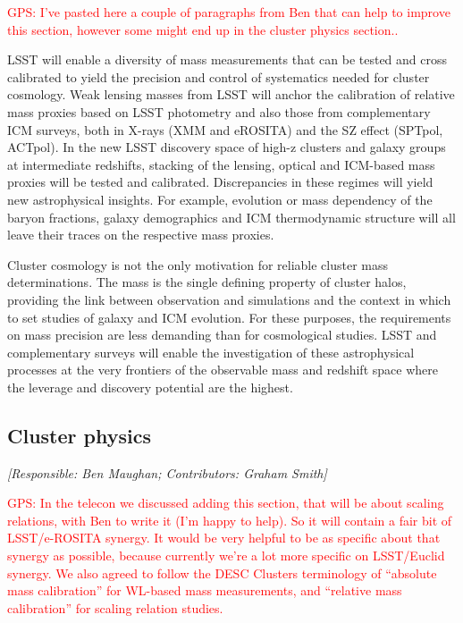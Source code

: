 \documentclass[a4paper,11pt]{article}
\newcommand{\red}{\textcolor{red}}
\begin{document}
\red{GPS: I've pasted here a couple of paragraphs from Ben that can
  help to improve this section, however some might end up in the
  cluster physics section..}

LSST will enable a diversity of mass measurements that can be tested
and cross calibrated to yield the precision and control of systematics
needed for cluster cosmology. Weak lensing masses from LSST will
anchor the calibration of relative mass proxies based on LSST
photometry and also those from complementary ICM surveys, both in
X-rays (XMM and eROSITA) and the SZ effect (SPTpol, ACTpol). In the
new LSST discovery space of high-z clusters and galaxy groups at
intermediate redshifts, stacking of the lensing, optical and ICM-based
mass proxies will be tested and calibrated. Discrepancies in these
regimes will yield new astrophysical insights. For example, evolution
or mass dependency of the baryon fractions, galaxy demographics and
ICM thermodynamic structure will all leave their traces on the
respective mass proxies.

Cluster cosmology is not the only motivation for reliable cluster mass
determinations. The mass is the single defining property of cluster
halos, providing the link between observation and simulations and the
context in which to set studies of galaxy and ICM evolution. For these
purposes, the requirements on mass precision are less demanding than
for cosmological studies. LSST and complementary surveys will enable
the investigation of these astrophysical processes at the very
frontiers of the observable mass and redshift space where the leverage
and discovery potential are the highest.

\subsection{Cluster physics}\label{sec:physics}

{\it [Responsible: Ben Maughan; Contributors: Graham Smith]}

\noindent\red{GPS: In the telecon we discussed adding this section,
  that will be about scaling relations, with Ben to write it (I'm
  happy to help).  So it will contain a fair bit of LSST/e-ROSITA
  synergy.  It would be very helpful to be as specific about that
  synergy as possible, because currently we're a lot more specific on
  LSST/Euclid synergy.  We also agreed to follow the DESC Clusters
  terminology of ``absolute mass calibration'' for WL-based mass
  measurements, and ``relative mass calibration'' for scaling relation
  studies.}
\end{document}
